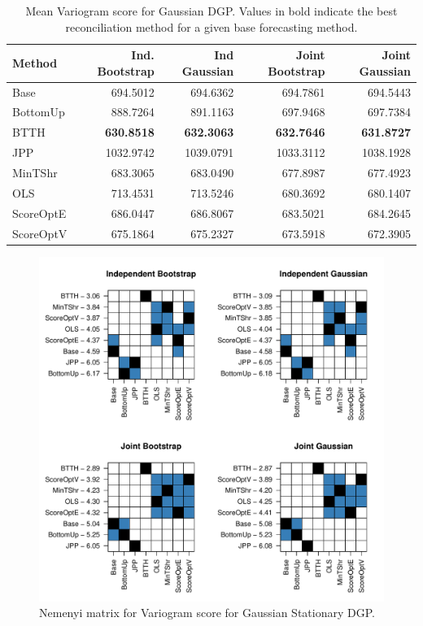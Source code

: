 \documentclass[12pt]{article}
\theoremstyle{definition}
\begin{document}
\begin{table}[H]
	\footnotesize
	\caption{\label{tab:gsv}Mean Variogram score for Gaussian DGP.  Values in bold indicate the best reconciliation method for a given base forecasting method.}
	\centering
	\begin{tabular}[t]{l|r|r|r|r}
		\hline
		Method & Ind. Bootstrap & Ind Gaussian & Joint Bootstrap & Joint Gaussian\\
		\hline
		Base & 694.5012 & 694.6362 & 694.7861 & 694.5443\\
		\hline
		BottomUp & 888.7264 & 891.1163 & 697.9468 & 697.7384\\
		\hline
		BTTH & \textbf{630.8518} & \textbf{632.3063} & \textbf{632.7646} & \textbf{631.8727}\\
		\hline
		JPP & 1032.9742 & 1039.0791 & 1033.3112 & 1038.1928\\
		\hline
		MinTShr & 683.3065 & 683.0490 & 677.8987 & 677.4923\\
		\hline
		OLS & 713.4531 & 713.5246 & 680.3692 & 680.1407\\
		\hline
		ScoreOptE & 686.0447 & 686.8067 & 683.5021 & 684.2645\\
		\hline
		ScoreOptV & 675.1864 & 675.2327 & 673.5918 & 672.3905\\
		\hline
	\end{tabular}
\end{table}

\begin{figure}[H]
	\centering
	\includegraphics[width=.75\textwidth]{Figs/gsv.pdf}
	\caption{Nemenyi matrix for Variogram score for Gaussian Stationary DGP.}
	\label{fig:gsv}
	
\end{figure}	
\end{document}
